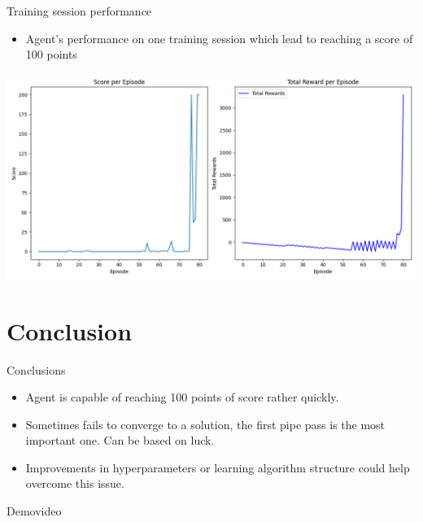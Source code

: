 \documentclass[xcolor=dvipsnames]{beamer}
\begin{document}
\begin{frame}{Training session performance}
    \begin{itemize}
        \item Agent's performance on one training session which lead to reaching a score of 100 points
    \end{itemize}
    \begin{center}
        \vspace{0.05cm} %
        \includegraphics[height=0.5\textwidth, width=\textwidth]{resources/figure1.png}
    \end{center}
\end{frame}


\section{Conclusion}
\begin{frame}{Conclusions}
    \begin{itemize}
        \item Agent is capable of reaching 100 points of score rather quickly.
        \item Sometimes fails to converge to a solution, the first pipe pass is the most important one. Can be based on luck.
        \item Improvements in hyperparameters or learning algorithm structure could help overcome this issue.
    \end{itemize}
\end{frame}

\begin{frame}{Demovideo}

\end{frame}
\end{document}

